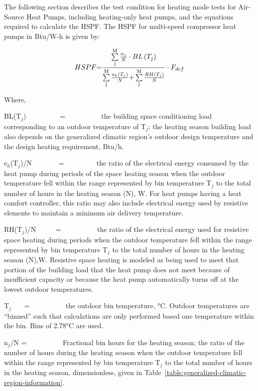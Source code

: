 The following section describes the test condition for heating mode tests for Air-Source Heat Pumps, including heating-only heat pumps, and the equations required to calculate the HSPF. The HSPF for multi-speed compressor heat pumps in Btu/W-h is given by:

\begin{equation}
HSPF{\rm{ = }}\frac{{\sum\limits_{\rm{j}}^{\rm{M}} {\frac{{{n_j}}}{N} \cdot BL\left( {{T_j}} \right)} }}{{\sum\limits_{\rm{j}}^{\rm{M}} {\frac{{{e_h}\left( {{T_j}} \right)}}{N}{\rm{ + }}} \sum\limits_{\rm{j}}^{\rm{M}} {\frac{{RH\left( {{T_j}} \right)}}{N}} }} \cdot {F_{def}}
\end{equation}

Where,

BL(T\(_{j}\))~~~~~~~~~ = ~~~~~~~~~ the building space conditioning load corresponding to an outdoor temperature of T\(_{j}\); the heating season building load also depends on the generalized climatic region's outdoor design temperature and the design heating requirement, Btu/h.

e\(_{h}\)(T\(_{j}\))/N~~~~~~~ = ~~~~~~~~ the ratio of the electrical energy consumed by the heat pump during periods of the space heating season when the outdoor temperature fell within the range represented by bin temperature T\(_{j}\) to the total number of hours in the heating season (N), W. For heat pumps having a heat comfort controller, this ratio may also include electrical energy used by resistive elements to maintain a minimum air delivery temperature.

RH(T\(_{j}\))/N~~~~~ = ~~~~~~~~~ the ratio of the electrical energy used for resistive space heating during periods when the outdoor temperature fell within the range represented by bin temperature T\(_{j}\) to the total number of hours in the heating season (N),W. Resistive space heating is modeled as being used to meet that portion of the building load that the heat pump does not meet because of insufficient capacity or because the heat pump automatically turns off at the lowest outdoor temperatures.

T\(_{j}\)~~~ = ~~~~~~~~~ the outdoor bin temperature, °C. Outdoor temperatures are ``binned'' such that calculations are only performed based one temperature within the bin. Bins of 2.78°C are used.

n\(_{j}\)/N = ~~~~~~~~~ Fractional bin hours for the heating season; the ratio of the number of hours during the heating season when the outdoor temperature fell within the range represented by bin temperature T\(_{j}\) to the total number of hours in the heating season, dimensionless, given in Table~\ref{table:generalized-climatic-region-information}.

